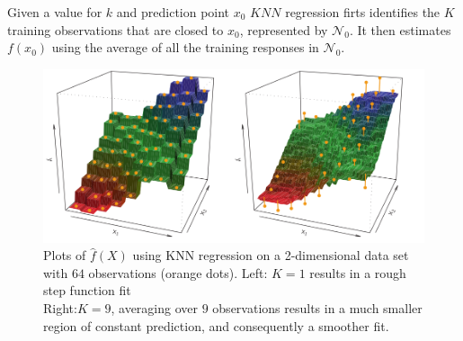 Given a value for $k$ and prediction point $x_{0}$ $KNN$ regression
firts identifies the $K$ training observations that are closed to 
$x_{0}$, represented by $\mathcal{N}_{0}$. It then estimates $f\left(
x_{0}\right)$ using the average of all the training responses in
$\mathcal{N}_{0}$.
\begin{center}
\end{center}
\begin{figure}[H]
	\begin{center}
		\includegraphics[width=\textwidth]{./chap/1chap/2sec/5images/1_KNNregression.png}
	\end{center}
	\caption{Plots of $\widehat{f}\left(X\right)$ using KNN 
	regression on a 2-dimensional data set with $64$ observations
	(orange dots). Left: $K=1$ results in a rough step function fit
	\\Right:$K=9$, averaging over $9$ observations results in a 
	much smaller region of constant prediction, and consequently
	a smoother fit.}
	\label{fig:fig 3.1}
\end{figure}
